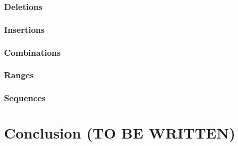\documentclass[12pt]{article}
\theoremstyle{definition}
\begin{document}
\subsubsection{Deletions}

\subsubsection{Insertions}

\subsubsection{Combinations}

\subsubsection{Ranges}

\subsubsection{Sequences}


\newpage

\section{Conclusion (TO BE WRITTEN)}

\newpage


\nocite{*}

\end{document}
